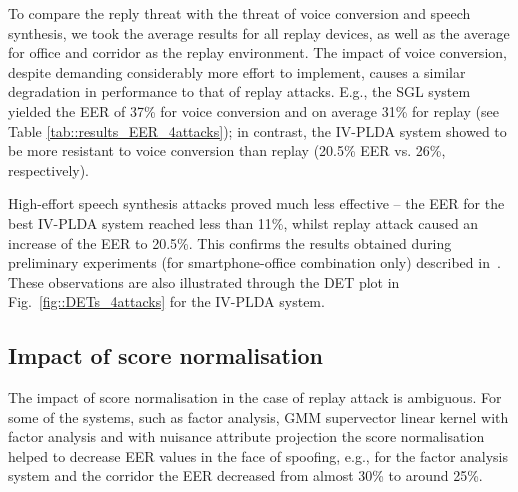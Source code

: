 To compare the reply threat with the threat of voice conversion and speech synthesis, we took the average results for all replay devices, as well as the average for office and corridor as the replay environment.
The impact of voice conversion, despite demanding considerably more effort to implement, causes a similar degradation in performance to that of replay attacks. E.g., the SGL system yielded the EER of 37\% for voice conversion and on average 31\% for replay (see Table \ref{tab::results_EER_4attacks}); in contrast, the IV-PLDA system showed to be more resistant to voice conversion than replay (20.5\% EER vs. 26\%, respectively). 

High-effort speech synthesis attacks proved much less effective -- the EER for the best IV-PLDA system reached less than 11\%, whilst replay attack caused an increase of the EER to 20.5\%. This confirms the results obtained during preliminary experiments (for smartphone-office combination only) described in~\cite{Alegre2014}. These observations are also illustrated through the DET plot in Fig.~\ref{fig::DETs_4attacks} for the IV-PLDA system.




\subsection{Impact of score normalisation}

The impact of score normalisation in the case of replay attack is ambiguous.  For some of the systems, such as factor analysis, GMM supervector linear kernel with factor analysis and with nuisance attribute projection the score normalisation helped to decrease EER values in the face of spoofing, e.g., for the factor analysis system and the corridor the EER decreased from almost 30\% to around 25\%. 


